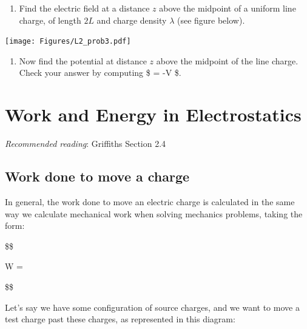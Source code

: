 \documentclass[
  letterpaper,
  DIV=11,
  numbers=noendperiod]{scrreprt}
\providecommand{\tightlist}{%
  \setlength{\itemsep}{0pt}\setlength{\parskip}{0pt}}\usepackage{longtable,booktabs,array}
\begin{document}
\begin{enumerate}
\def\labelenumi{(\alph{enumi})}
\tightlist
\item
  Find the electric field at a distance \(z\) above the midpoint of a
  uniform line charge, of length \(2L\) and charge density \(\lambda\)
  (see figure below).
\end{enumerate}

\texttt{[image: Figures/L2\_prob3.pdf]}

\begin{enumerate}
\def\labelenumi{(\alph{enumi})}
\setcounter{enumi}{1}
\tightlist
\item
  Now find the potential at distance \(z\) above the midpoint of the
  line charge. Check your answer by computing \$ =
  -\nabla V \$.
\end{enumerate}


\chapter{Work and Energy in
Electrostatics}\label{work-and-energy-in-electrostatics}

\newcommand{\l}{\mathrm{\mathbf{l}}}
\newcommand{\E}{\mathrm{\mathbf{E}}}
\newcommand{\F}{\mathrm{\mathbf{F}}}
\newcommand{\r}{\mathrm{\mathbf{r}}}

\newcommand{\x}{\mathrm{\mathbf{x}}}
\newcommand{\y}{\mathrm{\mathbf{y}}}
\newcommand{\z}{\mathrm{\mathbf{z}}}
\newcommand{\p}{\mathrm{\mathbf{p}}}
\newcommand{\d}{\mathrm{\mathbf{d}}}

\newcommand{\a}{\mathrm{\mathbf{a}}}
\newcommand{\b}{\mathrm{\mathbf{b}}}

\emph{Recommended reading}: Griffiths Section 2.4

\section{Work done to move a charge}\label{work-done-to-move-a-charge}

In general, the work done to move an electric charge is calculated in
the same way we calculate mechanical work when solving mechanics
problems, taking the form:

\$\$

W = \int {} \cdot {}  

\$\$

Let's say we have some configuration of source charges, and we want to
move a test charge past these charges, as represented in this diagram:
\end{document}

